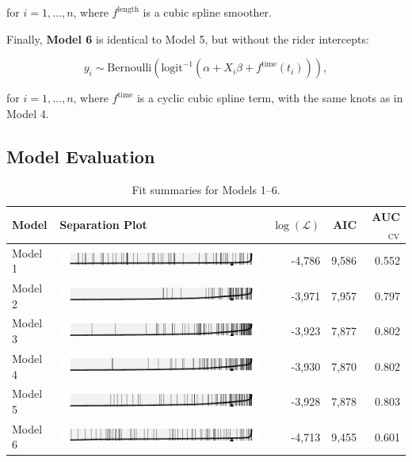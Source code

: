 \documentclass[]{article}
\begin{document}
for \(i = 1, \ldots, n\), where \(f^\text{length}\) is a cubic spline
smoother.

Finally, \textbf{Model 6} is identical to Model 5, but without the rider
intercepts:

\begin{equation}
y_i \sim \text{Bernoulli} \left(
\text{logit}^{-1} \left( \alpha + X_i \beta + 
f^\text{time} (t_i)  \right)
\right),
\end{equation}

for \(i = 1, \ldots, n\), where \(f^\text{time}\) is a cyclic cubic
spline term, with the same knots as in Model 4.

\subsection{Model Evaluation}\label{model-evaluation}

\begin{table}[htb]
\centering
\caption{Fit summaries for Models 1--6.\label{tab:modelfits}}
\begin{tabular}{lm{4in}rrr}
\toprule
\textbf{Model} & \textbf{Separation Plot} & \textbf{$\log (\mathcal{L})$} & \textbf{AIC} &
\textbf{AUC}$_{\text{CV}}$\footnotemark\\
\midrule
Model 1 & \includegraphics{figure/model1-sep.pdf}
& -4,786 & 9,586 & 0.552\\
Model 2 & \includegraphics{figure/model2-sep.pdf}
& -3,971 & 7,957 & 0.797\\
Model 3 & \includegraphics{figure/model3-sep.pdf}
& -3,923 & 7,877 & 0.802\\
Model 4 & \includegraphics{figure/model4-sep.pdf}
& -3,930 & 7,870 & 0.802\\
Model 5 & \includegraphics{figure/model5-sep.pdf}
& -3,928 & 7,878 & 0.803\\
Model 6 & \includegraphics{figure/model6-sep.pdf}
& -4,713 & 9,455 & 0.601\\
\bottomrule
\end{tabular}
\end{table}
\end{document}
